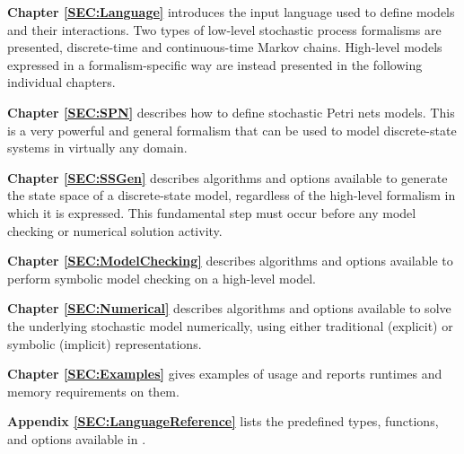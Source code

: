 \begin{description}

\item{\bf Chapter \ref{SEC:Language}}
introduces the {\smart} input language used to define models and their
interactions.
Two types of low-level stochastic process formalisms
are presented, discrete-time and continuous-time
Markov chains. High-level models expressed in
a formalism-specific way are instead presented in the following
individual chapters.


\item{\bf Chapter \ref{SEC:SPN}}
describes how to define stochastic Petri nets models.
This is a very powerful and general formalism that can be used to model
discrete-state systems in virtually any domain.

\item{\bf Chapter \ref{SEC:SSGen}}
describes algorithms and options available to generate the state space
of a discrete-state model, regardless of the high-level formalism in which
it is expressed.
This fundamental step must occur before any model checking or
numerical solution activity.

\item{\bf Chapter \ref{SEC:ModelChecking}}
describes algorithms and options available to perform symbolic
model checking on a high-level model.

\item{\bf Chapter \ref{SEC:Numerical}}
describes algorithms and options available to solve the underlying
stochastic model numerically, using either traditional (explicit) or
symbolic (implicit) representations.



\item{\bf Chapter \ref{SEC:Examples}}
gives examples of {\smart} usage and reports runtimes and memory requirements
on them.

\item{\bf Appendix \ref{SEC:LanguageReference}}
lists the predefined types, functions, and options available in \smart.


\end{description}
